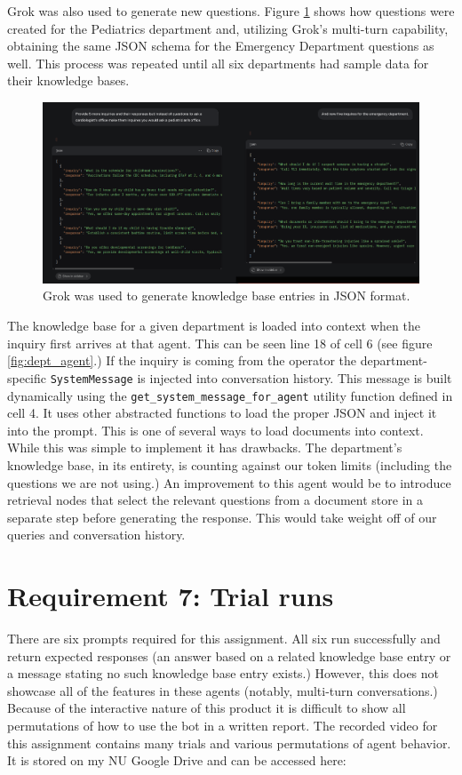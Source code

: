 \documentclass[11pt,letterpaper]{article}
\begin{document}
Grok was also used to generate new questions. Figure \ref{fig:grok_gen} shows how questions were created for the Pediatrics department and, utilizing Grok's multi-turn capability, obtaining the same JSON schema for the Emergency Department questions as well. This process was repeated until all six departments had sample data for their knowledge bases. 

\begin{figure}[h!]
    \centering
    \includegraphics{grok_02.png}
    \caption{Grok was used to generate knowledge base entries in JSON format.}
    \label{fig:grok_gen}
\end{figure}

The knowledge base for a given department is loaded into context when the inquiry first arrives at that agent.
This can be seen line 18 of cell 6 (see figure \ref{fig:dept_agent}.) If the inquiry is coming from the operator the department-specific \texttt{SystemMessage} is injected into conversation history. This message is built dynamically using the \texttt{get\_system\_message\_for\_agent} utility function defined in cell 4. It uses other abstracted functions to load the proper JSON and inject it into the prompt. This is one of several ways to load documents into context. While this was simple to implement it has drawbacks. The department's knowledge base, in its entirety, is counting against our token limits (including the questions we are not using.) An improvement to this agent would be to introduce retrieval nodes that select the relevant questions from a document store in a separate step before generating the response. This would take weight off of our queries and conversation history.

\clearpage

\section*{Requirement 7: Trial runs}
\tab There are six prompts required for this assignment. All six run successfully and return expected responses (an answer based on a related knowledge base entry or a message stating no such knowledge base entry exists.) However, this does not showcase all of the features in these agents (notably, multi-turn conversations.) Because of the interactive nature of this product it is difficult to show all permutations of how to use the bot in a written report. The recorded video for this assignment contains many trials and various permutations of agent behavior. It is stored on my NU Google Drive and can be accessed here:
\end{document}
